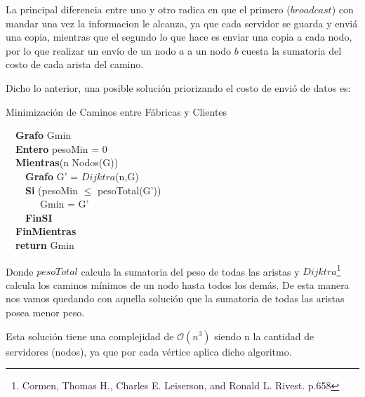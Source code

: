  La principal diferencia entre uno y otro radica en que el primero ($broadcast$) con mandar una vez la informacion le alcanza, ya que cada servidor se guarda y enviá una copia, mientras que el segundo lo que hace es enviar una copia a cada nodo, por lo que realizar un envío de un nodo $a$ a un nodo $b$ cuesta la sumatoria del costo de cada arista del camino. \newline

 Dicho lo anterior, una posible solución priorizando el costo de envió de datos es: \newline

\begin{algorithm}[H]
	\SetAlgoLined
	\caption{Minimización de Caminos entre Fábricas y Clientes}
	\ \ \textbf{Grafo} Gmin \\
	\ \ \textbf{Entero} pesoMin = 0 \\
	\ \ \textbf{Mientras}(n \in Nodos(G)) \\
				\ \ \ \ \textbf{Grafo} G' = $Dijktra$(n,G) \\
				\ \ \ \ \textbf{Si} (pesoMin $\leq$ pesoTotal(G')) \\
	      \ \ \ \ \ \ \ Gmin = G' \\
				\ \ \ \ \textbf{FinSI} \\
		\ \ \textbf{FinMientras} \\
		\ \ \textbf{return} Gmin 
\end{algorithm}

Donde $pesoTotal$ calcula la sumatoria del peso de todas las aristas y  $Dijktra$\footnote{Cormen, Thomas H., Charles E. Leiserson, and Ronald L. Rivest. p.658} calcula los caminos mínimos de un nodo hasta todos los demás. De esta manera nos vamos quedando con aquella solución que la sumatoria de todas las aristas posea menor peso. \newline

Esta solución tiene una complejidad de $\mathcal{O}(n^{3})$ siendo n la cantidad de servidores (nodos), ya que por cada vértice aplica dicho algoritmo.\newline
